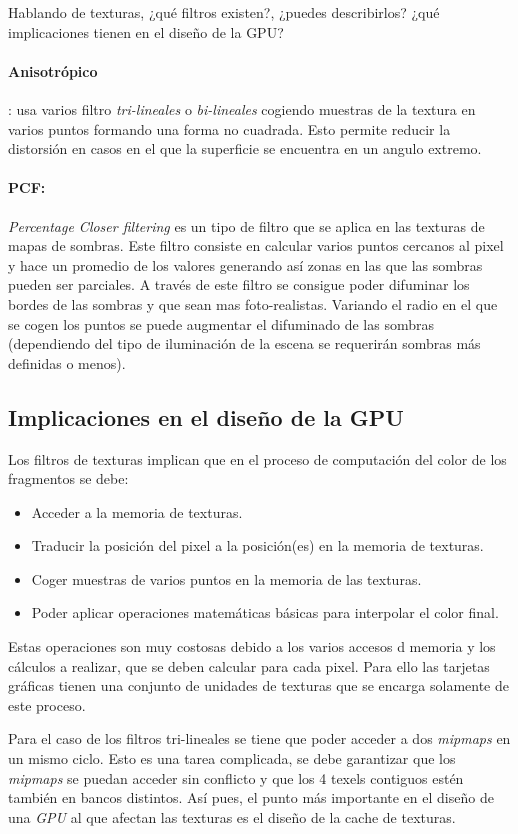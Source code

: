 \begin{pregunta}{Hablando de texturas, ¿qué filtros existen?, ¿puedes describirlos? ¿qué
implicaciones tienen en el diseño de la GPU?}
\paragraph{Anisotrópico}: usa varios filtro \emph{tri-lineales} o
\emph{bi-lineales} cogiendo muestras de la textura en varios puntos formando una
forma no cuadrada. Esto permite reducir la distorsión en casos en el que la
superficie se encuentra en un angulo extremo.

\paragraph{PCF:} \emph{Percentage Closer filtering} es un tipo de filtro que se
aplica en las texturas de mapas de sombras. Este filtro consiste en calcular
varios puntos cercanos al pixel y hace un promedio de los valores generando así
zonas en las que las sombras pueden ser parciales. A través de
este filtro se consigue poder difuminar los bordes de las sombras y que sean mas
foto-realistas. Variando el radio en el que se cogen los puntos se puede
augmentar el difuminado de las sombras (dependiendo del tipo de iluminación de
la escena se requerirán sombras más definidas o menos).

\pagebreak
\subsection*{Implicaciones en el diseño de la GPU}

Los filtros de texturas implican que en el proceso de computación del color de
los fragmentos se debe:

\begin{itemize}
    \item Acceder a la memoria de texturas.
    \item Traducir la posición del pixel a la posición(es) en la memoria de
        texturas.
    \item Coger muestras de varios puntos en la memoria de las texturas.
    \item Poder aplicar operaciones matemáticas básicas para interpolar el color
        final.
\end{itemize}

Estas operaciones son muy costosas debido a los varios accesos d memoria y los
cálculos a realizar, que se deben calcular para cada pixel. Para ello las
tarjetas gráficas tienen una conjunto de unidades de texturas que se encarga
solamente de este proceso.

Para el caso de los filtros tri-lineales se tiene que poder acceder a dos
\emph{mipmaps} en un mismo ciclo. Esto es una tarea complicada, se debe
garantizar que los \emph{mipmaps} se puedan acceder sin conflicto y que los 4
texels contiguos estén también en bancos distintos. Así pues, el punto más
importante en el diseño de una \emph{GPU} al que afectan las texturas es el
diseño de la cache de texturas.


\end{pregunta}
